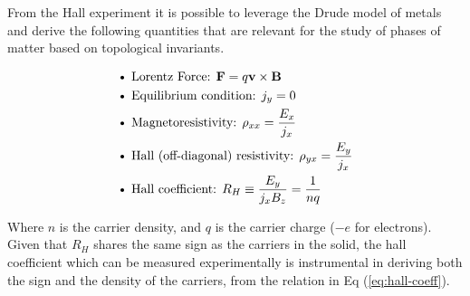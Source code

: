     From the Hall experiment it is possible to leverage the Drude model of metals and derive the following quantities that are relevant for the study of phases of matter based on topological invariants.

\begin{align}
    & \text{\textbullet\ Lorentz\ Force: } \mb{F} = q \mb{v} \times \mb{B} \\
    & \text{\textbullet\ Equilibrium\ condition: } j_{y} = 0 \\
    & \text{\textbullet\ Magnetoresistivity: }  \rho_{xx} = \dfrac{E_{x}}{j_{x}} \\
    & \text{\textbullet\ Hall (off-diagonal) resistivity: } \rho_{yx} = \dfrac{E_{y}}{j_x} \\
    & \text{\textbullet\ Hall coefficient: } R_{H} \equiv \dfrac{E_{y}}{j_{x}B_{z}} = \dfrac{1}{nq} \label{eq:hall-coeff}
\end{align}

Where $n$ is the carrier density, and $q$ is the carrier charge ($-e$ for electrons). Given that $R_{H}$ shares the same sign as the carriers in the solid, the hall coefficient which can be measured experimentally is instrumental in deriving both the sign and the density of the carriers, from the relation in Eq (\ref{eq:hall-coeff}).